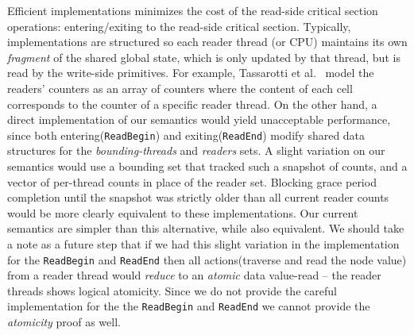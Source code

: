  Efficient implementations minimizes the cost of the read-side critical section operations: entering/exiting to the read-side critical section. Typically, implementations are structured so each reader thread (or CPU) maintains its own \emph{fragment} of the shared global state, which is only updated by that thread, but is read by the write-side primitives. For example, Tassarotti et al.~\cite{verrcu} model the readers' counters as an array of counters where the content of each cell corresponds to the counter of a specific reader thread. On the other hand, a direct implementation of our semantics would yield unacceptable performance, since both entering(\lstinline|ReadBegin|) and exiting(\lstinline|ReadEnd|) modify shared data structures for the \textit{bounding-threads} and \textit{readers} sets. A slight variation on our semantics would use a bounding set  that tracked such a snapshot of counts, and a vector of per-thread counts in place of the reader set. Blocking grace period completion until the snapshot was strictly older than all current reader counts would be more clearly equivalent to these implementations. Our current semantics are simpler than this alternative, while also equivalent. We should take a note as a future step that if we had this slight variation in the implementation for the \lstinline|ReadBegin| and \lstinline|ReadEnd| then all actions(traverse and read the node value) from a reader thread would \textit{reduce} to an \textit{atomic} data value-read -- the reader threads shows logical atomicity. Since we do not provide the careful implementation for the the \lstinline|ReadBegin| and \lstinline|ReadEnd| we cannot provide the \textit{atomicity} proof as well.

